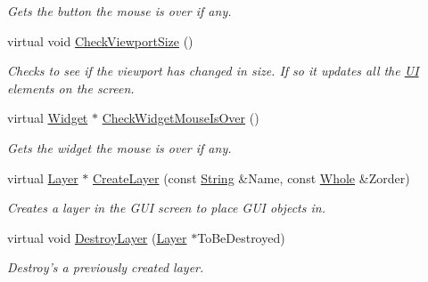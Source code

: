 \begin{DoxyCompactItemize}
\begin{DoxyCompactList}\small\item\em Gets the button the mouse is over if any. \item\end{DoxyCompactList}\item 
\hypertarget{classMezzanine_1_1UI_1_1Screen_a7ccbb6d2424f8d7bf437ebd717af84c1}{
virtual void \hyperlink{classMezzanine_1_1UI_1_1Screen_a7ccbb6d2424f8d7bf437ebd717af84c1}{CheckViewportSize} ()}
\label{classMezzanine_1_1UI_1_1Screen_a7ccbb6d2424f8d7bf437ebd717af84c1}

\begin{DoxyCompactList}\small\item\em Checks to see if the viewport has changed in size. If so it updates all the \hyperlink{namespaceMezzanine_1_1UI}{UI} elements on the screen. \item\end{DoxyCompactList}\item 
virtual \hyperlink{classMezzanine_1_1UI_1_1Widget}{Widget} $\ast$ \hyperlink{classMezzanine_1_1UI_1_1Screen_aba94ad01214919f9a7506bdef39aee64}{CheckWidgetMouseIsOver} ()
\begin{DoxyCompactList}\small\item\em Gets the widget the mouse is over if any. \item\end{DoxyCompactList}\item 
virtual \hyperlink{classMezzanine_1_1UI_1_1Layer}{Layer} $\ast$ \hyperlink{classMezzanine_1_1UI_1_1Screen_a47c85a1fad08b96b3b24b2c1402a4fcd}{CreateLayer} (const \hyperlink{namespaceMezzanine_acf9fcc130e6ebf08e3d8491aebcf1c86}{String} \&Name, const \hyperlink{namespaceMezzanine_adcbb6ce6d1eb4379d109e51171e2e493}{Whole} \&Zorder)
\begin{DoxyCompactList}\small\item\em Creates a layer in the GUI screen to place GUI objects in. \item\end{DoxyCompactList}\item 
virtual void \hyperlink{classMezzanine_1_1UI_1_1Screen_a7f81a6d97593c7c152d543e499f3b2a1}{DestroyLayer} (\hyperlink{classMezzanine_1_1UI_1_1Layer}{Layer} $\ast$ToBeDestroyed)
\begin{DoxyCompactList}\small\item\em Destroy's a previously created layer. \item\end{DoxyCompactList}\item 

\end{DoxyCompactItemize}
